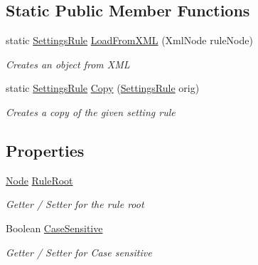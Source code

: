\subsection*{Static Public Member Functions}
\begin{DoxyCompactItemize}
\item 
static \hyperlink{class_web_analyzer_1_1_models_1_1_settings_model_1_1_settings_rule}{Settings\+Rule} \hyperlink{class_web_analyzer_1_1_models_1_1_settings_model_1_1_settings_rule_a444331f780bd89b144249f64148dc05e}{Load\+From\+X\+M\+L} (Xml\+Node rule\+Node)
\begin{DoxyCompactList}\small\item\em Creates an object from X\+M\+L \end{DoxyCompactList}\item 
static \hyperlink{class_web_analyzer_1_1_models_1_1_settings_model_1_1_settings_rule}{Settings\+Rule} \hyperlink{class_web_analyzer_1_1_models_1_1_settings_model_1_1_settings_rule_aa59768fb94258353389ed98f702c258f}{Copy} (\hyperlink{class_web_analyzer_1_1_models_1_1_settings_model_1_1_settings_rule}{Settings\+Rule} orig)
\begin{DoxyCompactList}\small\item\em Creates a copy of the given setting rule \end{DoxyCompactList}\end{DoxyCompactItemize}
\subsection*{Properties}
\begin{DoxyCompactItemize}
\item 
\hyperlink{class_web_analyzer_1_1_models_1_1_settings_model_1_1_expression_tree_1_1_node}{Node} \hyperlink{class_web_analyzer_1_1_models_1_1_settings_model_1_1_settings_rule_a4f1e8ed93d01d4d4bd68a8482286a0f3}{Rule\+Root}
\begin{DoxyCompactList}\small\item\em Getter / Setter for the rule root \end{DoxyCompactList}\item 
Boolean \hyperlink{class_web_analyzer_1_1_models_1_1_settings_model_1_1_settings_rule_ae696484e3ef7781243fd1855d28a9816}{Case\+Sensitive}
\begin{DoxyCompactList}\small\item\em Getter / Setter for Case sensitive \end{DoxyCompactList}\end{DoxyCompactItemize}
